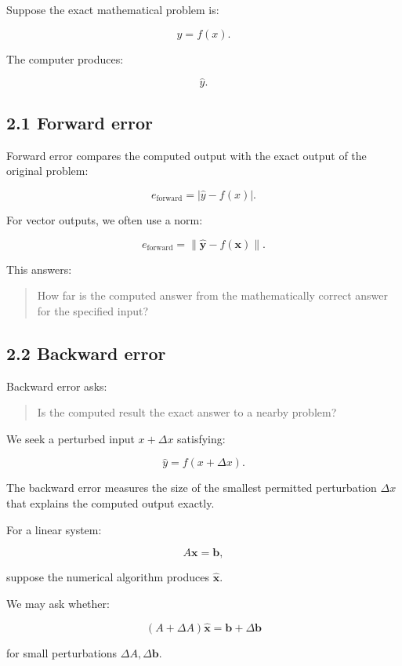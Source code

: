 Suppose the exact mathematical problem is:

\[ y=f(x). \]

The computer produces:

\[ \hat y. \]

\subsection{2.1 Forward error}\label{02-foundations-ii-ch028-forward-error}

Forward error compares the computed output with the exact output of the original problem:

\[ \boxed{ e_{\mathrm{forward}}= |\hat y-f(x)| }. \]

For vector outputs, we often use a norm:

\[ \boxed{ e_{\mathrm{forward}} = \|\hat{\mathbf y}-f(\mathbf x)\| }. \]

This answers:

\begin{quote}
How far is the computed answer from the mathematically correct answer for the specified input?
\end{quote}

\subsection{2.2 Backward error}\label{02-foundations-ii-ch028-backward-error}

Backward error asks:

\begin{quote}
Is the computed result the exact answer to a nearby problem?
\end{quote}

We seek a perturbed input \(x+\Delta x\) satisfying:

\[ \boxed{ \hat y=f(x+\Delta x) }. \]

The backward error measures the size of the smallest permitted perturbation \(\Delta x\) that explains the computed output exactly.

For a linear system:

\[ A\mathbf x=\mathbf b, \]

suppose the numerical algorithm produces \(\hat{\mathbf x}\).

We may ask whether:

\[ (A+\Delta A)\hat{\mathbf x} = \mathbf b+\Delta\mathbf b \]

for small perturbations \(\Delta A,\Delta\mathbf b\).

